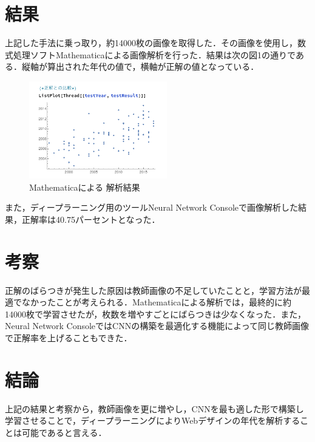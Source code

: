 \documentclass[uplatex,twocolumn,dvipdfmx]{jsarticle}
\begin{document}
\section{結果}

上記した手法に乗っ取り，約14000枚の画像を取得した．その画像を使用し，数式処理ソフトMathematicaによる画像解析を行った．結果は次の図1の通りである．縦軸が算出された年代の値で，横軸が正解の値となっている．
\vspace{-1zh}
\begin{figure}[htb]
\centering
\includegraphics[width=6cm,clip]{graph.PNG}
\caption{Mathematicaによる
解析結果}
\end{figure}
\vspace{-1zh}

また，ディープラーニング用のツールNeural Network Consoleで画像解析した結果，正解率は40.75パーセントとなった．

\section{考察}

正解のばらつきが発生した原因は教師画像の不足していたことと，学習方法が最適でなかったことが考えられる．Mathematicaによる解析では，最終的に約14000枚で学習させたが，枚数を増やすごとにばらつきは少なくなった．また，Neural Network ConsoleではCNNの構築を最適化する機能によって同じ教師画像で正解率を上げることもできた．

\section{結論}

上記の結果と考察から，教師画像を更に増やし，CNNを最も適した形で構築し学習させることで，ディープラーニングによりWebデザインの年代を解析することは可能であると言える．


\end{document}
